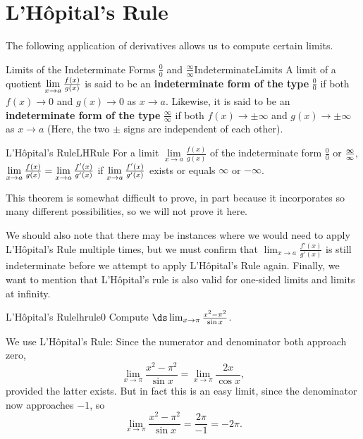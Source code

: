 \section{L'H\^opital's Rule}\label{sec:LH}
The following application of derivatives allows us to compute certain limits.

\begin{definition}{Limits of the Indeterminate Forms $\frac{0}{0}$ and $\frac{\infty}{\infty}$}{IndeterminateLimits}
A limit of a quotient $\lim\limits_{x\rightarrow a}\frac{f\left( x\right) }{%
	g\left( x\right) }$ is said to be an \textbf{indeterminate form of the type }%
$\frac{0}{0}$ if both $f\left( x\right) \rightarrow 0$ and $g\left( x\right)
\rightarrow 0$ as $x\rightarrow a.$ Likewise, it is said to be an \textbf{%
	indeterminate form of the type} $\frac{\infty }{\infty }$ if both $f\left(
x\right) \rightarrow \pm \infty $ and $g\left( x\right) \rightarrow \pm
\infty $ as $x\rightarrow a$ (Here, the two $\pm $ signs are independent of
each other).
\end{definition}

\begin{theorem}{L'H\^opital's Rule}{LHRule}
For a limit $\lim\limits_{x\rightarrow a}\frac{f\left( x\right) }{g\left(
	x\right) }$ of the indeterminate form $\frac{0}{0}$ or $\frac{\infty }{%
	\infty },$ $\lim\limits_{x\rightarrow a}\frac{f\left( x\right) }{g\left(
	x\right) }=\lim\limits_{x\rightarrow a}\frac{f^{\prime }\left( x\right) }{%
	g^{\prime }\left( x\right) }$ if $\lim\limits_{x\rightarrow a}\frac{%
	f^{\prime }\left( x\right) }{g^{\prime }\left( x\right) }$ exists or equals $%
\infty $ or $-\infty$.
\end{theorem}

This theorem is somewhat difficult to prove, in part because it
incorporates so many different possibilities, so we will not prove it
here.

We should also note that there may be instances where we would need to apply L'H\^opital's Rule multiple times, but we must confirm that $\lim_{x\to a}\frac{f'(x)}{g'(x)}$ is still indeterminate before we attempt to apply L'H\^opital's Rule again. Finally, we want to mention that L'H\^opital's rule is also valid for one-sided limits and limits at infinity.

\begin{example}{L'H\^opital's Rule}{lhrule0}
Compute $\ds\lim_{x\to \pi}\frac{x^2-\pi^2}{\sin x}$.
\end{example}

\begin{solution} 
We use L'H\^opital's Rule: Since the numerator and denominator
both approach zero,
$$\lim_{x\to \pi}\frac{x^2-\pi^2}{\sin x}=
\lim_{x\to \pi}\frac{2x}{\cos x},$$
provided the latter exists. But in fact this is an easy limit, since
the denominator now approaches $-1$, so 
$$\lim_{x\to \pi}\frac{x^2-\pi^2}{\sin x}=\frac{2\pi}{-1} = -2\pi.$$
\end{solution}

